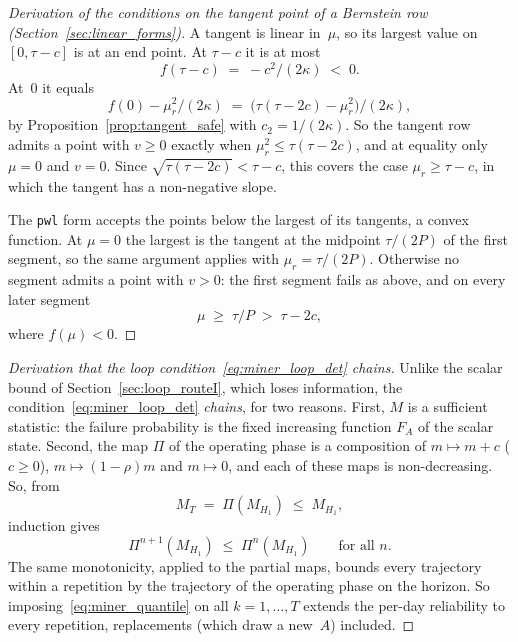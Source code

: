 \documentclass[11pt,a4paper]{article}
\theoremstyle{plain}
\theoremstyle{definition}
\theoremstyle{remark}
\begin{document}
\label{drv:bernstein_tangent_point}
\begin{proof}[Derivation of the conditions on the tangent point of a Bernstein row (Section~\ref{sec:linear_forms})]
A tangent is linear in~$\mu$, so its largest value on $[0, \tau - c]$ is at an end point.
At $\tau - c$ it is at most
\begin{equation}
  f(\tau - c) \;=\; -c^2/(2\kappa) \;<\; 0.
\end{equation}
At~$0$ it equals
\begin{equation}
  f(0) - \mu_r^2/(2\kappa) \;=\; \bigl(\tau(\tau - 2c) - \mu_r^2\bigr)/(2\kappa),
\end{equation}
by Proposition~\ref{prop:tangent_safe} with $c_2 = 1/(2\kappa)$.
So the tangent row admits a point with $v \ge 0$ exactly when $\mu_r^2 \le \tau(\tau - 2c)$, and at equality only $\mu = 0$ and $v = 0$.
Since $\sqrt{\tau(\tau - 2c)} < \tau - c$, this covers the case $\mu_r \ge \tau - c$, in which the tangent has a non-negative slope.

The \texttt{pwl} form accepts the points below the largest of its tangents, a convex function.
At $\mu = 0$ the largest is the tangent at the midpoint $\tau/(2P)$ of the first segment, so the same argument applies with $\mu_r = \tau/(2P)$.
Otherwise no segment admits a point with $v > 0$: the first segment fails as above, and on every later segment
\begin{equation}
  \mu \;\ge\; \tau/P \;>\; \tau - 2c,
\end{equation}
where $f(\mu) < 0$.
\end{proof}

\label{drv:miner_loop}
\begin{proof}[Derivation that the loop condition~\eqref{eq:miner_loop_det} chains]
Unlike the scalar bound of Section~\ref{sec:loop_routeI}, which loses information, the condition~\eqref{eq:miner_loop_det} \emph{chains}, for two reasons.
First, $M$ is a sufficient statistic: the failure probability is the fixed increasing function $F_A$ of the scalar state.
Second, the map $\Pi$ of the operating phase is a composition of $m \mapsto m + c$ ($c \ge 0$), $m \mapsto (1-\rho)m$ and $m \mapsto 0$, and each of these maps is non-decreasing.
So, from
\begin{equation}
  M_T \;=\; \Pi(M_{H_1}) \;\le\; M_{H_1},
\end{equation}
induction gives
\begin{equation}
  \Pi^{n+1}(M_{H_1}) \;\le\; \Pi^{n}(M_{H_1}) \qquad \text{for all } n.
\end{equation}
The same monotonicity, applied to the partial maps, bounds every trajectory within a repetition by the trajectory of the operating phase on the horizon.
So imposing~\eqref{eq:miner_quantile} on all $k = 1,\dots,T$ extends the per-day reliability to every repetition, replacements (which draw a new~$A$) included.
\end{proof}
\end{document}
